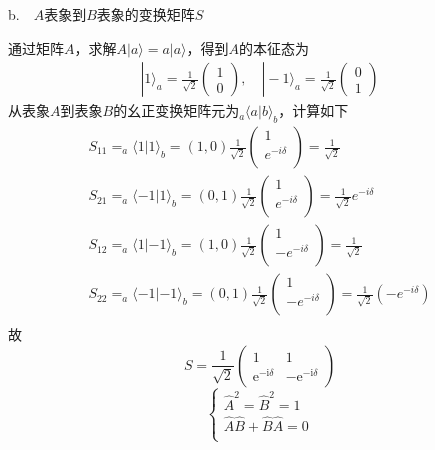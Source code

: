 b.\ \  $A$表象到$B$表象的变换矩阵$S$

通过矩阵$A$，求解$A|a \rangle=a|a \rangle$，得到$A$的本征态为
$$
\begin{array}{l}
|1\rangle_{a}=\frac{1}{\sqrt{2}}\left(\begin{array}{l}
1 \\
0
\end{array}\right), \quad|-1\rangle_{a}=\frac{1}{\sqrt{2}}\left(\begin{array}{l}
0 \\
1
\end{array}\right)
\end{array}
$$
从表象$A$到表象$B$的幺正变换矩阵元为$_a\langle a|b\rangle _b$，计算如下
$$
\begin{array}{l}
	\left. S_{11}=_a\langle 1|1\rangle _b=(1,0)\frac{1}{\sqrt{2}}\left( \begin{array}{c}
	1\\
	e^{-i\delta}\\
\end{array} \right) =\frac{1}{\sqrt{2}} \right.\\
	S_{21}=_a\langle -1|1\rangle _b=(0,1)\frac{1}{\sqrt{2}}\left( \begin{array}{c}
	1\\
	e^{-i\delta}\\
\end{array} \right) =\frac{1}{\sqrt{2}}e^{-i\delta}\\
	S_{12}=_a\langle 1|-1\rangle _b=(1,0)\frac{1}{\sqrt{2}}\left( \begin{array}{c}
	1\\
	-e^{-i\delta}\\
\end{array} \right) =\frac{1}{\sqrt{2}}\\
	S_{22}=_a\langle -1|-1\rangle _b=(0,1)\frac{1}{\sqrt{2}}\left( \begin{array}{c}
	1\\
	-e^{-i\delta}\\
\end{array} \right) =\frac{1}{\sqrt{2}}\left( -e^{-i\delta} \right)\\
\end{array}
$$
故
$$
S=\frac{1}{\sqrt{2}}\left(\begin{array}{cc}
1 & 1 \\
\mathrm{e}^{-\mathrm{i} \delta} & -\mathrm{e}^{-\mathrm{i} \delta}
\end{array}\right)
$$
$$
\left\{ \begin{array}{l}
	\hat{A}^2=\hat{B}^2=1\\
	\hat{A}\hat{B}+\hat{B}\hat{A}=0\\
\end{array} \right. 
$$
$\bm{}$
